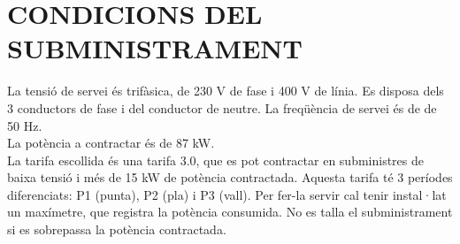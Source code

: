\chapter{\uppercase{Condicions del subministrament}}
La tensió de servei és trifàsica, de 230 V de fase i 400 V de línia. Es disposa dels 3 conductors de fase i del conductor de neutre. La freqüència de servei és de de 50 Hz.\\
\newline
La potència a contractar és de 87 kW.\\
\newline La tarifa escollida és una tarifa 3.0, que es pot contractar en subministres de baixa tensió i més de 15 kW de potència contractada. Aquesta tarifa té 3 períodes diferenciats: P1 (punta), P2 (pla) i P3 (vall). Per fer-la servir cal tenir instal·lat un maxímetre, que registra la potència consumida. No es talla el subministrament si es sobrepassa la potència contractada.
\clearpage